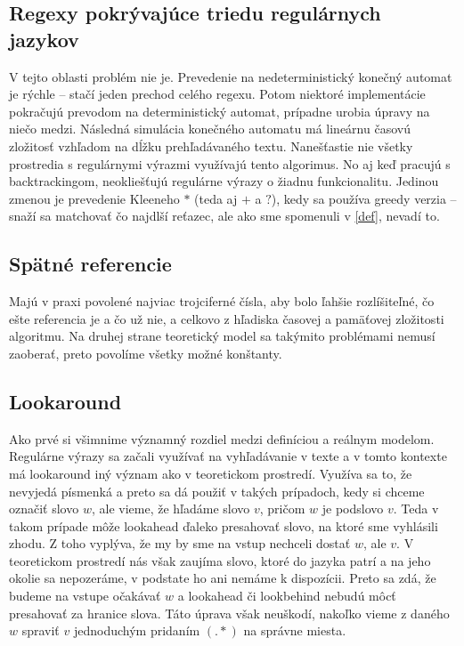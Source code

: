 \subsection*{Regexy pokrývajúce triedu regulárnych jazykov}
\label{praxregex}

V tejto oblasti problém nie je. Prevedenie na nedeterministický konečný automat je rýchle -- stačí jeden prechod celého regexu. Potom niektoré implementácie pokračujú prevodom na deterministický automat, prípadne urobia úpravy na niečo medzi. Nás\-led\-ná simulácia konečného automatu má lineárnu časovú zložitosť vzhľadom na dĺžku prehľadávaného textu\cite{ExtendedRegexPower}. Nanešťastie nie všetky prostredia s regulárnymi výrazmi využívajú tento algorimus. No aj keď pracujú s backtrackingom, neokliešťujú regulárne výrazy o žiadnu funkcionalitu. Jedinou zmenou je prevedenie Kleeneho $*$ (teda aj $+$ a $?$), kedy sa používa greedy verzia -- snaží sa matchovať čo najdlší reťazec, ale ako sme spomenuli v \ref{def}, nevadí to.

\subsection*{Spätné referencie}
\label{praxbackref}

Majú v praxi povolené najviac trojciferné čísla\cite{Python3Documentation}, aby bolo ľahšie rozlíšiteľné, čo ešte referencia je a čo už nie, a celkovo z hľadiska časovej a pamäťovej zložitosti algoritmu. Na druhej strane teoretický model sa takýmito problémami nemusí zaoberať, preto povolíme všetky možné konštanty.

\subsection*{Lookaround}
\label{praxla}

Ako prvé si všimnime významný rozdiel medzi definíciou a reálnym modelom. Re\-gu\-lár\-ne výrazy sa začali využívať na vyhľadávanie v texte a v tomto kontexte má lookaround iný význam ako v teoretickom prostredí. Využíva sa to, že nevyjedá písmenká a preto sa dá použiť v takých prípadoch, kedy si chceme označiť slovo $w$, ale vieme, že hľadáme slovo $v$, pričom $w$ je podslovo $v$. Teda v takom prípade môže look\-ahead ďaleko presahovať slovo, na ktoré sme vyhlásili zhodu. Z toho vyplýva, že my by sme na vstup nechceli dostať $w$, ale $v$. V teoretickom prostredí nás však zaujíma slovo, ktoré do jazyka patrí a na jeho okolie sa nepozeráme, v podstate ho ani nemáme k dispozícii. Preto sa zdá, že budeme na vstupe očakávať $w$ a lookahead či lookbehind nebudú môcť presahovať za hranice slova. Táto úprava však neuškodí, nakoľko vieme z daného $w$ spraviť $v$ jednoduchým pridaním $(.*)$ na správne miesta.


